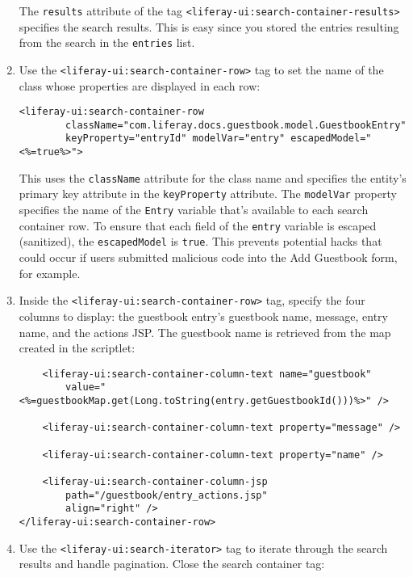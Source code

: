 \begin{enumerate}
  The \texttt{results} attribute of the tag
  \texttt{\textless{}liferay-ui:search-container-results\textgreater{}}
  specifies the search results. This is easy since you stored the
  entries resulting from the search in the \texttt{entries} list.
\item
  Use the
  \texttt{\textless{}liferay-ui:search-container-row\textgreater{}} tag
  to set the name of the class whose properties are displayed in each
  row:

\begin{verbatim}
<liferay-ui:search-container-row
        className="com.liferay.docs.guestbook.model.GuestbookEntry"
        keyProperty="entryId" modelVar="entry" escapedModel="<%=true%>">
\end{verbatim}

  This uses the \texttt{className} attribute for the class name and
  specifies the entity's primary key attribute in the
  \texttt{keyProperty} attribute. The \texttt{modelVar} property
  specifies the name of the \texttt{Entry} variable that's available to
  each search container row. To ensure that each field of the
  \texttt{entry} variable is escaped (sanitized), the
  \texttt{escapedModel} is \texttt{true}. This prevents potential hacks
  that could occur if users submitted malicious code into the Add
  Guestbook form, for example.
\item
  Inside the
  \texttt{\textless{}liferay-ui:search-container-row\textgreater{}} tag,
  specify the four columns to display: the guestbook entry's guestbook
  name, message, entry name, and the actions JSP. The guestbook name is
  retrieved from the map created in the scriptlet:

\begin{verbatim}
    <liferay-ui:search-container-column-text name="guestbook"
        value="<%=guestbookMap.get(Long.toString(entry.getGuestbookId()))%>" />

    <liferay-ui:search-container-column-text property="message" />

    <liferay-ui:search-container-column-text property="name" />

    <liferay-ui:search-container-column-jsp
        path="/guestbook/entry_actions.jsp"
        align="right" />
</liferay-ui:search-container-row>
\end{verbatim}
\item
  Use the \texttt{\textless{}liferay-ui:search-iterator\textgreater{}}
  tag to iterate through the search results and handle pagination. Close
  the search container tag:


\end{enumerate}
